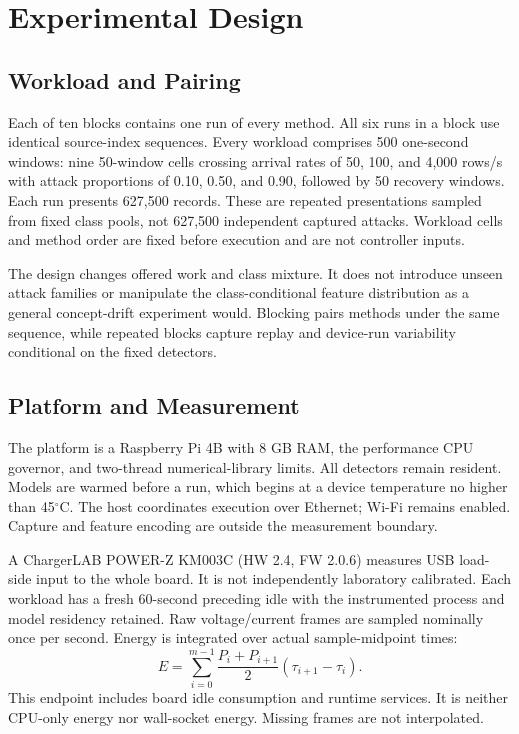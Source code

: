 \documentclass[journal]{IEEEtran}
\begin{document}
\section{Experimental Design}\label{sec:experiment}
\subsection{Workload and Pairing}
Each of ten blocks contains one run of every method. All six runs in a block use identical source-index sequences. Every workload comprises 500 one-second windows: nine 50-window cells crossing arrival rates of 50, 100, and 4,000 rows/s with attack proportions of 0.10, 0.50, and 0.90, followed by 50 recovery windows. Each run presents 627,500 records. These are repeated presentations sampled from fixed class pools, not 627,500 independent captured attacks. Workload cells and method order are fixed before execution and are not controller inputs.

The design changes offered work and class mixture. It does not introduce unseen attack families or manipulate the class-conditional feature distribution as a general concept-drift experiment would. Blocking pairs methods under the same sequence, while repeated blocks capture replay and device-run variability conditional on the fixed detectors.

\subsection{Platform and Measurement}
The platform is a Raspberry Pi 4B with 8 GB RAM, the performance CPU governor, and two-thread numerical-library limits. All detectors remain resident. Models are warmed before a run, which begins at a device temperature no higher than 45$^\circ$C. The host coordinates execution over Ethernet; Wi-Fi remains enabled. Capture and feature encoding are outside the measurement boundary.

A ChargerLAB POWER-Z KM003C (HW 2.4, FW 2.0.6) measures USB load-side input to the whole board. It is not independently laboratory calibrated. Each workload has a fresh 60-second preceding idle with the instrumented process and model residency retained. Raw voltage/current frames are sampled nominally once per second. Energy is integrated over actual sample-midpoint times:
\begin{equation}\label{eq:energy}
E=\sum_{i=0}^{m-1}\frac{P_i+P_{i+1}}{2}(\tau_{i+1}-\tau_i).
\end{equation}
This endpoint includes board idle consumption and runtime services. It is neither CPU-only energy nor wall-socket energy. Missing frames are not interpolated.
\end{document}
